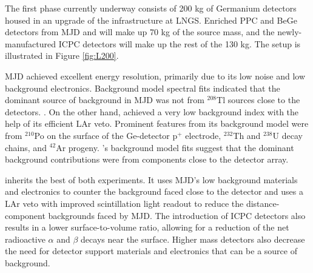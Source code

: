 The first phase currently underway consists of 200 kg of Germanium detectors housed in an upgrade of the {\Gerda} infrastructure at LNGS. Enriched PPC and BeGe detectors from MJD and {\Gerda} will make up 70 kg of the source mass, and the newly-manufactured ICPC detectors will make up the rest of the 130 kg. The setup is illustrated in Figure \ref{fig:L200}. 

MJD achieved excellent energy resolution, primarily due to its low noise and low background electronics. Background model spectral fits indicated that the dominant source of background in MJD was not from $^{208}$Tl sources close to the detectors. \cite{Buuck_thesis}. On the other hand, {\Gerda} achieved a very low background index with the help of its efficient LAr veto. Prominent features from its background model were from $^{210}$Po on the surface of the Ge-detector p$^+$ electrode, $^{232}$Th and $^{238}$U decay chains, and $^{42}$Ar progeny. {\Gerda}'s background model fits suggest that the dominant background contributions \cite{GERDA_final} were from components close to the detector array.

{\Ltwo} inherits the best of both experiments. It uses MJD's low background materials and electronics to counter the background {\Gerda} faced close to the detector and uses a LAr veto with improved scintillation light readout to reduce the distance-component backgrounds faced by MJD. The introduction of ICPC detectors also results in a lower surface-to-volume ratio, allowing for a reduction of the net radioactive $\alpha$ and $\beta$ decays near the surface. Higher mass detectors also decrease the need for detector support materials and electronics that can be a source of background. 

